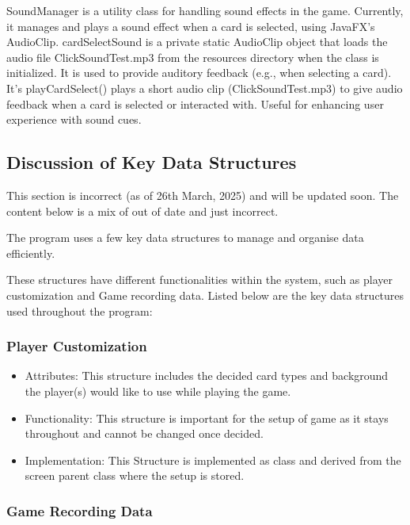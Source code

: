\documentclass[a4paper]{project}
\begin{document}
				SoundManager is a utility class for handling sound effects in the game. Currently, it manages and plays a sound effect when a card is selected, using JavaFX's AudioClip. cardSelectSound is a private static AudioClip object that loads the audio file ClickSoundTest.mp3 from the resources directory when the class is initialized. It is used to provide auditory feedback (e.g., when selecting a card). It’s playCardSelect() plays a short audio clip (ClickSoundTest.mp3) to give audio feedback when a card is selected or interacted with. Useful for enhancing user experience with sound cues.
		
		\subsection{Discussion of Key Data Structures}\label{subsec:discussion-of-key-data-structures}
		
			This section is incorrect (as of 26th March, 2025) and will be updated soon. The content below is a mix of out of date and just incorrect.
			
			The program uses a few key data structures to manage and organise data efficiently.
			
			These structures have different functionalities within the system, such as player customization and Game recording data.
			Listed below are the key data structures used throughout the program:
		
		\subsubsection{Player Customization}\label{subsubsec:player-customization}
		
			\begin{itemize}
				\item Attributes: This structure includes the decided card types and background the player(s) would like to use while playing the game.
				\item Functionality: This structure is important for the setup of game as it stays throughout and cannot be changed once decided.
				\item Implementation: This Structure is implemented as class and derived from the screen parent class where the setup is stored. 
			\end{itemize}
		
		\subsubsection{Game Recording Data}\label{subsubsec:game-recording-data}
		
\end{document}

